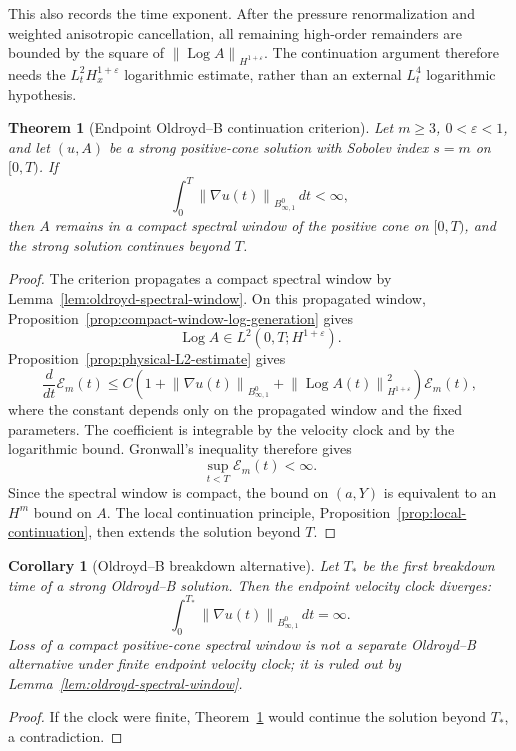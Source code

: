 \documentclass[11pt]{article}
\newtheorem{theorem}{Theorem}[section]
\newtheorem{corollary}{Corollary}[section]
\newcommand{\Log}{\operatorname{Log}}
\newcommand{\calE}{\mathcal E}
\newcommand{\eps}{\varepsilon}
\newcommand{\norm}[1]{\left\lVert #1\right\rVert}
\newcommand{\Besov}{B^0_{\infty,1}}
\begin{document}
This also records the time exponent.  After the pressure renormalization and
weighted anisotropic cancellation, all remaining high-order remainders are
bounded by the square of \(\norm{\Log A}_{H^{1+\eps}}\).  The continuation
argument therefore needs the \(L^2_tH^{1+\eps}_x\) logarithmic estimate, rather than an external \(L^4_t\) logarithmic hypothesis.

\begin{theorem}[Endpoint Oldroyd--B continuation criterion]
\label{thm:continuation}
Let \(m\ge3\), \(0<\varepsilon<1\), and let \((u,A)\) be a strong positive-cone
solution with Sobolev index \(s=m\) on \([0,T)\).  If
\[
  \int_0^T\norm{\nabla u(t)}_{\Besov}\,dt<\infty,
  \label{eq:criterion}
\]
then \(A\) remains in a compact spectral window of the positive cone on
\([0,T)\), and the strong solution continues beyond \(T\).
\end{theorem}

\begin{proof}
The criterion propagates a compact spectral window by
Lemma~\ref{lem:oldroyd-spectral-window}.  On this propagated window,
Proposition~\ref{prop:compact-window-log-generation} gives
\[
  \Log A\in L^2(0,T;H^{1+\eps}).
\]
Proposition~\ref{prop:physical-L2-estimate} gives
\[
  \frac{d}{dt}\calE_m(t)
  \le C\left(1+\norm{\nabla u(t)}_{\Besov}
  +\norm{\Log A(t)}_{H^{1+\eps}}^2\right)\calE_m(t),
\]
where the constant depends only on the propagated window and the fixed
parameters.  The coefficient is integrable by the velocity clock and by the
logarithmic bound.  Gronwall's inequality therefore gives
\[
  \sup_{t<T}\calE_m(t)<\infty .
\]
Since the spectral window is compact, the bound on \((a,Y)\) is equivalent to
an \(H^m\) bound on \(A\).  The local continuation principle,
Proposition~\ref{prop:local-continuation}, then extends the solution beyond
\(T\).
\end{proof}

\begin{corollary}[Oldroyd--B breakdown alternative]
\label{cor:breakdown-alternative}
Let \(T_*\) be the first breakdown time of a strong Oldroyd--B solution.  Then
the endpoint velocity clock diverges:
\[
  \int_0^{T_*}\norm{\nabla u(t)}_{\Besov}\,dt=\infty .
\]
Loss of a compact positive-cone spectral window is not a separate Oldroyd--B
alternative under finite endpoint velocity clock; it is ruled out by
Lemma~\ref{lem:oldroyd-spectral-window}.
\end{corollary}

\begin{proof}
If the clock were finite, Theorem~\ref{thm:continuation} would continue the
solution beyond \(T_*\), a contradiction.
\end{proof}
\end{document}
